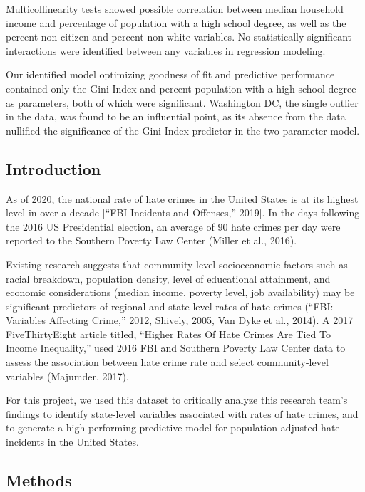 \documentclass[
]{article}
\begin{document}
Multicollinearity tests showed possible correlation between median
household income and percentage of population with a high school degree,
as well as the percent non-citizen and percent non-white variables. No
statistically significant interactions were identified between any
variables in regression modeling.

Our identified model optimizing goodness of fit and predictive
performance contained only the Gini Index and percent population with a
high school degree as parameters, both of which were significant.
Washington DC, the single outlier in the data, was found to be an
influential point, as its absence from the data nullified the
significance of the Gini Index predictor in the two-parameter model.

\hypertarget{introduction}{%
\subsection{Introduction}\label{introduction}}

As of 2020, the national rate of hate crimes in the United States is at
its highest level in over a decade {[}``FBI Incidents and Offenses,''
2019{]}. In the days following the 2016 US Presidential election, an
average of 90 hate crimes per day were reported to the Southern Poverty
Law Center (Miller et al., 2016).

Existing research suggests that community-level socioeconomic factors
such as racial breakdown, population density, level of educational
attainment, and economic considerations (median income, poverty level,
job availability) may be significant predictors of regional and
state-level rates of hate crimes (``FBI: Variables Affecting Crime,''
2012, Shively, 2005, Van Dyke et al., 2014). A 2017 FiveThirtyEight
article titled, ``Higher Rates Of Hate Crimes Are Tied To Income
Inequality,'' used 2016 FBI and Southern Poverty Law Center data to
assess the association between hate crime rate and select
community-level variables (Majumder, 2017).

For this project, we used this dataset to critically analyze this
research team's findings to identify state-level variables associated
with rates of hate crimes, and to generate a high performing predictive
model for population-adjusted hate incidents in the United States.

\hypertarget{methods}{%
\subsection{Methods}\label{methods}}
\end{document}
